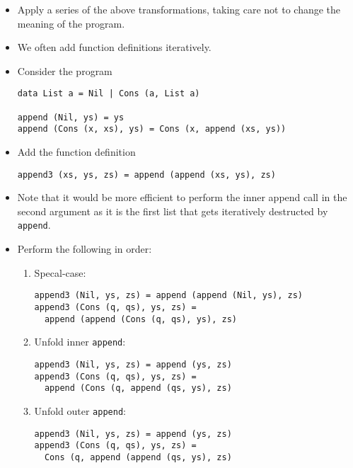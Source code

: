 \begin{itemize}

\item Apply a series of the above transformations, taking care not to change
the meaning of the program.

\item We often add function definitions iteratively.

\item Consider the program

\begin{verbatim}
data List a = Nil | Cons (a, List a)

append (Nil, ys) = ys
append (Cons (x, xs), ys) = Cons (x, append (xs, ys))
\end{verbatim}

\item Add the function definition

\begin{verbatim}
append3 (xs, ys, zs) = append (append (xs, ys), zs)
\end{verbatim}

\item Note that it would be more efficient to perform the inner append call in
the second argument as it is the first list that gets iteratively destructed by
\texttt{append}.

\item Perform the following in order:

\begin{enumerate}

\item Specal-case:

\begin{verbatim}
append3 (Nil, ys, zs) = append (append (Nil, ys), zs)
append3 (Cons (q, qs), ys, zs) =
  append (append (Cons (q, qs), ys), zs)
\end{verbatim}

\item Unfold inner \texttt{append}:

\begin{verbatim}
append3 (Nil, ys, zs) = append (ys, zs)
append3 (Cons (q, qs), ys, zs) =
  append (Cons (q, append (qs, ys), zs)
\end{verbatim}

\item Unfold outer \texttt{append}:

\begin{verbatim}
append3 (Nil, ys, zs) = append (ys, zs)
append3 (Cons (q, qs), ys, zs) =
  Cons (q, append (append (qs, ys), zs)
\end{verbatim}


\end{enumerate}
\end{itemize}
